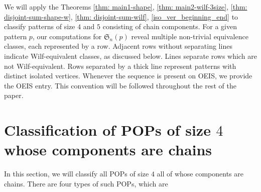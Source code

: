 \documentclass[12pt, english, a4paper]{article}
\newcommand{\Av}{\mathfrak{S}}
\theoremstyle{plain}
\theoremstyle{definition}
\theoremstyle{remark}
\begin{document}

We will apply the Theorems \ref{thm: main1-shape}, \ref{thm: main2-wilf-3size}, \ref{thm: disjoint-sum-shape-w}, \ref{thm: disjoint-sum-wilf}, \ref{iso_ver_beginning_end} to classify patterns of size $4$ and $5$ consisting of chain components. For a given pattern $p$, our computations for $\Av_n(p)$ reveal multiple non-trivial equivalence classes, each represented by a row. Adjacent rows without separating lines indicate Wilf-equivalent classes, as discussed below. Lines separate rows which are not Wilf-equivalent.
Rows separated by a thick line represent patterns with distinct isolated vertices. Whenever the sequence is present on OEIS, we provide the OEIS entry. This convention will be followed throughout the rest of the paper.
\section{Classification of POPs of size $4$  whose components are chains }\label{sec: len4}

In this section, we will classify all POPs of size $4$  all of whose components are chains. There are four types of such POPs, which are
\end{document}

